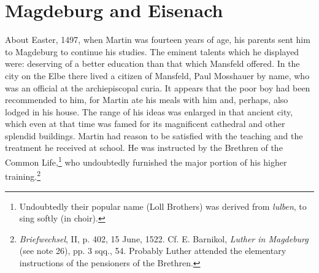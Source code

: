 \section{Magdeburg and Eisenach}

About Easter, 1497, when Martin was fourteen years of age, his
parents sent him to Magdeburg to continue his studies. The eminent
talents which he displayed were: deserving of a better education than
that which Mansfeld offered. In the city on the Elbe there lived a
citizen of Mansfeld, Paul Mosshauer by name, who was an official at the
archiepiscopal curia. It appears that the poor boy had been recommended to him, for Martin ate his meals with him and, perhaps,
also lodged in his house. The range of his ideas was enlarged in that
ancient city, which even at that time was famed for its magnificent
cathedral and other splendid buildings. Martin had reason to be satisfied with the teaching and the treatment he received at school. He
was instructed by the Brethren of the Common Life,\footnote{Undoubtedly their popular name (Loll Brothers) was derived from \textit{lulben}, to sing softly (in choir).}
who undoubtedly furnished the major portion of his higher training.\footnote{\textit{Briefwechsel}, II, p. 402, 15 June, 1522. Cf. E. Barnikol, \textit{Luther in Magdeburg} (see note 26),
pp. 3 sqq., 54. Probably Luther attended the elementary instructions of the pensioners
of the Brethren.
}



